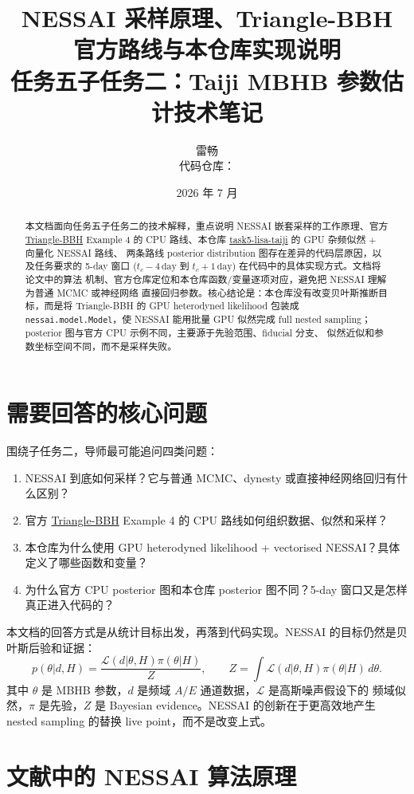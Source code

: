 \documentclass[11pt,a4paper]{ctexart}
\title{\bfseries NESSAI 采样原理、Triangle-BBH 官方路线与本仓库实现说明\\
\large 任务五子任务二：Taiji MBHB 参数估计技术笔记}
\author{雷畅\\代码仓库：\repo}
\date{2026 年 7 月}
\newcommand{\repo}{\href{https://github.com/leichang131-debug/task5-lisa-taiji}{task5-lisa-taiji}}
\newcommand{\official}{\href{https://github.com/TriangleDataCenter/Triangle-BBH}{Triangle-BBH}}
\begin{document}
\maketitle

\begin{abstract}
本文档面向任务五子任务二的技术解释，重点说明 NESSAI 嵌套采样的工作原理、官方
\official{} Example 4 的 CPU 路线、本仓库 \repo{} 的 GPU 杂频似然 + 向量化 NESSAI 路线、
两条路线 posterior distribution 图存在差异的代码层原因，以及任务要求的 5-day 窗口
(\(t_c-4\,\mathrm{day}\) 到 \(t_c+1\,\mathrm{day}\)) 在代码中的具体实现方式。文档将论文中的算法
机制、官方仓库定位和本仓库函数/变量逐项对应，避免把 NESSAI 理解为普通 MCMC 或神经网络
直接回归参数。核心结论是：本仓库没有改变贝叶斯推断目标，而是将 Triangle-BBH 的 GPU
heterodyned likelihood 包装成 \texttt{nessai.model.Model}，使 NESSAI 能用批量 GPU 似然完成
full nested sampling；posterior 图与官方 CPU 示例不同，主要源于先验范围、fiducial 分支、
似然近似和参数坐标空间不同，而不是采样失败。
\end{abstract}

\tableofcontents
\newpage

\section{需要回答的核心问题}

围绕子任务二，导师最可能追问四类问题：
\begin{enumerate}
  \item NESSAI 到底如何采样？它与普通 MCMC、dynesty 或直接神经网络回归有什么区别？
  \item 官方 \official{} Example 4 的 CPU 路线如何组织数据、似然和采样？
  \item 本仓库为什么使用 GPU heterodyned likelihood + vectorised NESSAI？具体定义了哪些函数和变量？
  \item 为什么官方 CPU posterior 图和本仓库 posterior 图不同？5-day 窗口又是怎样真正进入代码的？
\end{enumerate}

本文档的回答方式是从统计目标出发，再落到代码实现。NESSAI 的目标仍然是贝叶斯后验和证据：
\[
p(\theta|d,H)=\frac{\mathcal{L}(d|\theta,H)\pi(\theta|H)}{Z},
\qquad
Z=\int \mathcal{L}(d|\theta,H)\pi(\theta|H)\,d\theta .
\]
其中 \(\theta\) 是 MBHB 参数，\(d\) 是频域 \(A/E\) 通道数据，\(\mathcal{L}\) 是高斯噪声假设下的
频域似然，\(\pi\) 是先验，\(Z\) 是 Bayesian evidence。NESSAI 的创新在于更高效地产生
nested sampling 的替换 live point，而不是改变上式。

\section{文献中的 NESSAI 算法原理}
\end{document}
